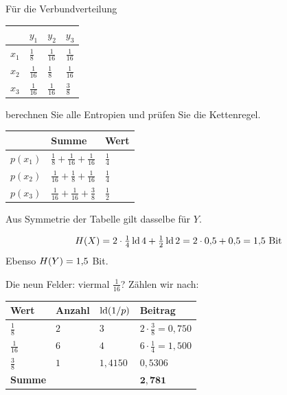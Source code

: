 \begin{aufgabe}
Für die Verbundverteilung
\begin{center}
{\small
\renewcommand{\arraystretch}{1.44}
\begin{tabular}{@{}P{1.8cm}P{1.6cm}P{1.6cm}P{1.6cm}@{}}
\toprule
& $y_1$ & $y_2$ & $y_3$\\
\midrule
$x_1$ & $\tfrac18$ & $\tfrac1{16}$ & $\tfrac1{16}$\\
$x_2$ & $\tfrac1{16}$ & $\tfrac18$ & $\tfrac1{16}$\\
$x_3$ & $\tfrac1{16}$ & $\tfrac1{16}$ & $\tfrac38$\\
\bottomrule
\end{tabular}}
\end{center}
berechnen Sie alle Entropien und prüfen Sie die Kettenregel.

\loesung
{}
\begin{center}
\renewcommand{\arraystretch}{1.46}
\begin{tabular}{@{}P{1.6cm}P{2.6cm}P{2.0cm}@{}}
\toprule
& \textbf{Summe} & \textbf{Wert}\\
\midrule
$p(x_1)$ & $\tfrac18+\tfrac1{16}+\tfrac1{16}$ & $\tfrac14$\\
$p(x_2)$ & $\tfrac1{16}+\tfrac18+\tfrac1{16}$ & $\tfrac14$\\
$p(x_3)$ & $\tfrac1{16}+\tfrac1{16}+\tfrac38$ & $\tfrac12$\\
\bottomrule
\end{tabular}
\end{center}

Aus Symmetrie der Tabelle gilt dasselbe für $Y$.

\[ H(X) = 2\cdot\tfrac14\operatorname{ld}4 + \tfrac12\operatorname{ld}2 = 2\cdot0{,}5 + 0{,}5 = 1{,}5 \ \text{Bit} \]
Ebenso $H(Y) = 1{,}5$ Bit.

Die neun Felder: viermal $\frac1{16}$? Zählen wir nach:
\begin{center}
\renewcommand{\arraystretch}{1.46}
\begin{tabular}{@{}P{1.8cm}P{1.6cm}P{2.0cm}P{2.2cm}@{}}
\toprule
\textbf{Wert} & \textbf{Anzahl} & $\operatorname{ld}(1/p)$ & \textbf{Beitrag}\\
\midrule
$\tfrac18$ & $2$ & $3$ & $2\cdot\tfrac38 = 0{,}750$\\
$\tfrac1{16}$ & $6$ & $4$ & $6\cdot\tfrac14 = 1{,}500$\\
$\tfrac38$ & $1$ & $1{,}4150$ & $0{,}5306$\\
\midrule
\textbf{Summe} & & & $\mathbf{2{,}781}$\\
\bottomrule
\end{tabular}
\end{center}


\end{aufgabe}
